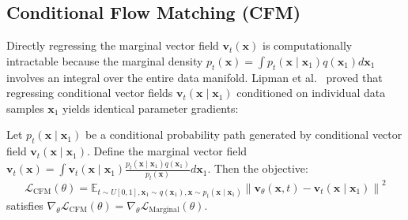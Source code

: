 \subsection{Conditional Flow Matching (CFM)}
Directly regressing the marginal vector field $\mathbf{v}_t(\mathbf{x})$ is computationally intractable because the marginal density $p_t(\mathbf{x}) = \int p_t(\mathbf{x} \mid \mathbf{x}_1) q(\mathbf{x}_1) d\mathbf{x}_1$ involves an integral over the entire data manifold. Lipman et al.~\cite{lipman2022flow} proved that regressing conditional vector fields $\mathbf{v}_t(\mathbf{x} \mid \mathbf{x}_1)$ conditioned on individual data samples $\mathbf{x}_1$ yields identical parameter gradients:
\begin{theorem}
Let $p_t(\mathbf{x} \mid \mathbf{x}_1)$ be a conditional probability path generated by conditional vector field $\mathbf{v}_t(\mathbf{x} \mid \mathbf{x}_1)$. Define the marginal vector field $\mathbf{v}_t(\mathbf{x}) = \int \mathbf{v}_t(\mathbf{x} \mid \mathbf{x}_1) \frac{p_t(\mathbf{x} \mid \mathbf{x}_1) q(\mathbf{x}_1)}{p_t(\mathbf{x})} d\mathbf{x}_1$. Then the objective:
\begin{equation}
    \mathcal{L}_{\text{CFM}}(\theta) = \mathbb{E}_{t \sim U[0, 1], \mathbf{x}_1 \sim q(\mathbf{x}_1), \mathbf{x} \sim p_t(\mathbf{x} \mid \mathbf{x}_1)} \left\| \mathbf{v}_\theta(\mathbf{x}, t) - \mathbf{v}_t(\mathbf{x} \mid \mathbf{x}_1) \right\|^2
    \label{eq:cfm_objective}
\end{equation}
satisfies $\nabla_\theta \mathcal{L}_{\text{CFM}}(\theta) = \nabla_\theta \mathcal{L}_{\text{Marginal}}(\theta)$.
\end{theorem}


